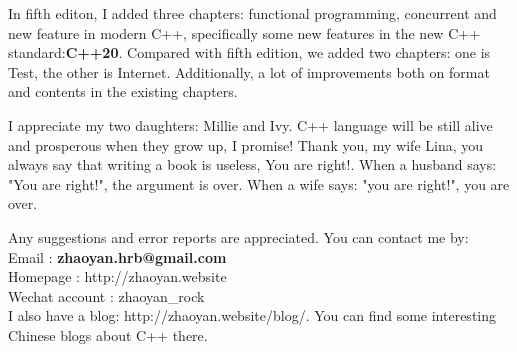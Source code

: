 \documentclass[a4paper,11pt,twoside]{book}
\begin{document}
\medskip

In fifth editon, I added three chapters: functional programming, concurrent and new feature in modern C++,  specifically some new features in the new C++ standard:\textbf{C++20}. Compared with fifth edition, we added two chapters: one is Test, the other is Internet. Additionally, a lot of improvements both on format and contents in the existing chapters. \medskip  

I appreciate my two daughters: Millie and Ivy. C++ language will be still alive and prosperous when they grow up, I promise! Thank you, my wife Lina, you always say that writing a book is useless, You are right!. When a husband says: "You are right!", the argument is over. When a wife says: "you are right!", you are over. \par \par \medskip


Any suggestions and error reports are appreciated. You can contact me by: \\
Email          : \textbf{zhaoyan.hrb@gmail.com}  \\ 
Homepage       : http://zhaoyan.website  \\ 
Wechat account : zhaoyan\_rock   \\ 

I also have a blog: http://zhaoyan.website/blog/. You can find some interesting Chinese blogs about C++ there. 
\end{document}
